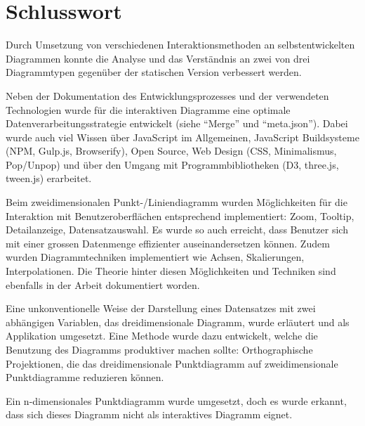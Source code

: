 \chapter{Schlusswort}

Durch Umsetzung von verschiedenen Interaktionsmethoden an selbstentwickelten Diagrammen konnte die Analyse und das Verständnis an zwei von drei Diagrammtypen gegenüber der statischen Version verbessert werden.

Neben der Dokumentation des Entwicklungsprozesses und der verwendeten Technologien wurde für die interaktiven Diagramme eine optimale Datenverarbeitungsstrategie entwickelt (siehe "`Merge"' und "`meta.json"'). Dabei wurde auch viel Wissen über JavaScript im Allgemeinen, JavaScript Buildsysteme (NPM, Gulp.js, Browserify), Open Source, Web Design (CSS, Minimalismus, Pop/Unpop) und über den Umgang mit Programmbibliotheken (D3, three.js, tween.js) erarbeitet.

Beim zweidimensionalen Punkt-/Liniendiagramm wurden Möglichkeiten für die Interaktion mit Benutzeroberflächen entsprechend implementiert: Zoom, Tooltip, Detailanzeige, Datensatzauswahl. Es wurde so auch erreicht, dass Benutzer sich mit einer grossen Datenmenge effizienter auseinandersetzen können. Zudem wurden Diagrammtechniken implementiert wie Achsen, Skalierungen, Interpolationen. Die Theorie hinter diesen Möglichkeiten und Techniken sind ebenfalls in der Arbeit dokumentiert worden.

Eine unkonventionelle Weise der Darstellung eines Datensatzes mit zwei abhängigen Variablen, das dreidimensionale Diagramm, wurde erläutert und als Applikation umgesetzt. Eine Methode wurde dazu entwickelt, welche die Benutzung des Diagramms produktiver machen sollte: Orthographische Projektionen, die das dreidimensionale Punktdiagramm auf zweidimensionale Punktdiagramme reduzieren können.

Ein n-dimensionales Punktdiagramm wurde umgesetzt, doch es wurde erkannt, dass sich dieses Diagramm nicht als interaktives Diagramm eignet.

